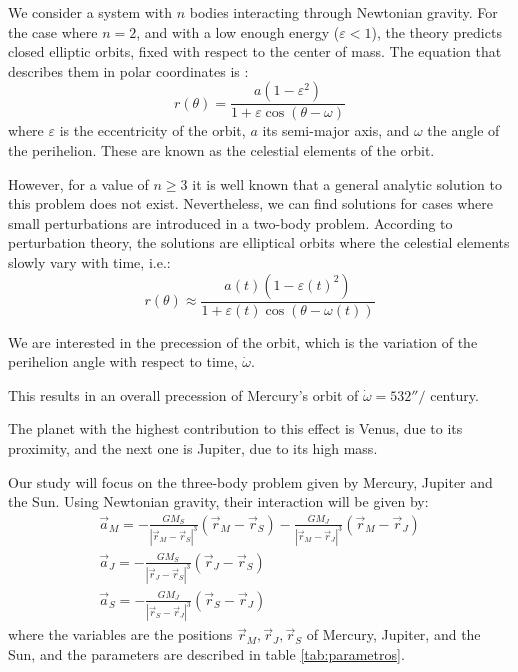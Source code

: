 \documentclass[journal]{IEEEtran}
\begin{document}
We consider a system with $n$ bodies interacting through Newtonian gravity. For the case where $n=2$, and with a low enough energy ($\varepsilon < 1$), the theory predicts closed elliptic orbits, fixed with respect to the center of mass. The equation that describes them in polar coordinates is \cite{goldstein}:
\begin{equation}
    r(\theta)=\frac{a(1-\varepsilon^2)}{1+\varepsilon\cos(\theta-\omega)}
    \label{eq:ellipse}
\end{equation}
where $\varepsilon$ is the eccentricity of the orbit, $a$ its semi-major axis, and $\omega$ the angle of the perihelion. These are known as the celestial elements of the orbit\cite{celestialmechanics}.

However, for a value of $n\geq3$ it is well known that a general analytic solution to this problem does not exist. Nevertheless, we can find solutions for cases where small perturbations are introduced in a two-body problem. According to perturbation theory, the solutions are elliptical orbits where the celestial elements slowly vary with time, i.e.:
\begin{equation}
    r(\theta)\approx\frac{a(t)(1-\varepsilon(t)^2)}{1+\varepsilon(t)\cos(\theta-\omega(t))}
    \label{eq:ellipse_precession}
\end{equation}

We are interested in the precession of the orbit, which is the variation of the perihelion angle with respect to time, $\dot\omega$.

This results in an overall precession of Mercury's orbit of $\dot\omega=532''/$ century.

The planet with the highest contribution to this effect is Venus, due to its proximity, and the next one is Jupiter, due to its high mass\cite{precession}.

Our study will focus on the three-body problem given by Mercury, Jupiter and the Sun. Using Newtonian gravity, their interaction will be given by:
\begin{gather}
    \vec{a}_M= -\frac{GM_S}{|\vec{r}_M-\vec{r}_S|^3}(\vec{r}_M-\vec{r}_S)
    -\frac{GM_J}{|\vec{r}_M-\vec{r}_J|^3}(\vec{r}_M-\vec{r}_J)\label{eq:Mercurio}\\
    \vec{a}_J= -\frac{GM_S}{|\vec{r}_J-\vec{r}_S|^3}(\vec{r}_J-\vec{r}_S) \label{eq:Jupiter}\\
    \vec{a}_S= -\frac{GM_J}{|\vec{r}_S-\vec{r}_J|^3}(\vec{r}_S-\vec{r}_J) \label{eq:Sol}
\end{gather}    
where the variables are the positions $\vec{r}_M, \vec{r}_J, \vec{r}_S$ of Mercury, Jupiter, and the Sun, and the parameters are described in table \ref{tab:parametros}.
\end{document}
